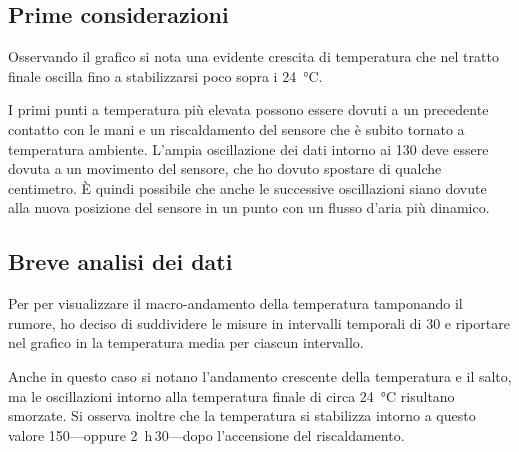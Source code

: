         \subsection{Prime considerazioni}
            Osservando il grafico si nota una evidente crescita di temperatura che nel tratto finale oscilla fino a stabilizzarsi poco sopra i \SI{24}{\celsius}.
            
            I primi punti a temperatura più elevata possono essere dovuti a un precedente contatto con le mani e un riscaldamento del sensore che è subito tornato a temperatura ambiente. L'ampia oscillazione dei dati intorno ai \SI{130}{\min} deve essere dovuta a un movimento del sensore, che ho dovuto spostare di qualche centimetro. È quindi possibile che anche le successive oscillazioni siano dovute alla nuova posizione del sensore in un punto con un flusso d'aria più dinamico.

        \subsection{Breve analisi dei dati}
            Per per visualizzare il macro-andamento della temperatura tamponando il rumore, ho deciso di suddividere le misure in intervalli temporali di \SI{30}{\min} e riportare nel grafico in  la temperatura media per ciascun intervallo.

            Anche in questo caso si notano l'andamento crescente della temperatura e il salto, ma le oscillazioni intorno alla temperatura finale di circa \SI{24}{\celsius} risultano smorzate. Si osserva inoltre che la temperatura si stabilizza intorno a questo valore \SI{150}{\min}---oppure  \SI{2}{\hour}\,\SI{30}{\min}---dopo l'accensione del riscaldamento.
            

